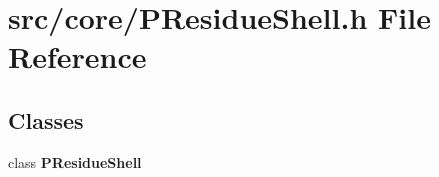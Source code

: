 \section{src/core/PResidue\-Shell.h File Reference}
\label{PResidueShell_8h}


\subsection*{Classes}
\begin{CompactItemize}
\item 
class {\bf PResidue\-Shell}
\end{CompactItemize}
